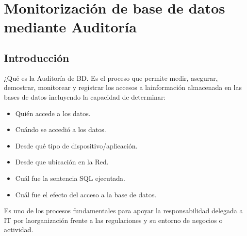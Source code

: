 \section{Monitorización de base de datos mediante Auditoría} 

\subsection{Introducción}
¿Qué es la Auditoría de BD. Es el proceso que permite medir, asegurar, demostrar, monitorear y registrar los accesos a lainformación almacenada en las bases de datos incluyendo la capacidad de determinar:

\begin{itemize} \item Quién accede a los datos.
				 \item Cuándo se accedió a los datos.
				  \item Desde qué tipo de dispositivo/aplicación.
				  \item Desde que ubicación en la Red.
				  \item Cuál fue la sentencia SQL ejecutada.
				  \item Cuál fue el efecto del acceso a la base de datos.
				  
				   \end{itemize}

Es uno de los procesos fundamentales para apoyar la responsabilidad delegada a IT por laorganización frente a las regulaciones y su entorno de negocios o actividad.

